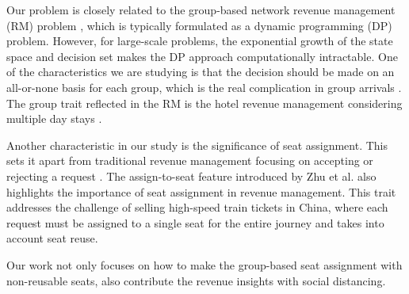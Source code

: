 

Our problem is closely related to the group-based network revenue management (RM) problem \cite{williamson1992airline}, which is typically formulated as a dynamic programming (DP) problem. However, for large-scale problems, the exponential growth of the state space and decision set makes the DP approach computationally intractable. One of the characteristics we are studying is that the decision should be made on an all-or-none basis for each group, which is the real complication in group arrivals \cite{talluri2006theory}. The group trait reflected in the RM is the hotel revenue management considering multiple day stays \cite{aydin2018decomposition, bitran1995application}. 

Another characteristic in our study is the significance of seat assignment. This sets it apart from traditional revenue management focusing on accepting or rejecting a request \cite{gallego1997multiproduct}. The assign-to-seat feature introduced by Zhu et al. \cite{zhu2023assign} also highlights the importance of seat assignment in revenue management. This trait addresses the challenge of selling high-speed train tickets in China, where each request must be assigned to a single seat for the entire journey and takes into account seat reuse.


Our work not only focuses on how to make the group-based seat assignment with non-reusable seats, also contribute the revenue insights with social distancing.






